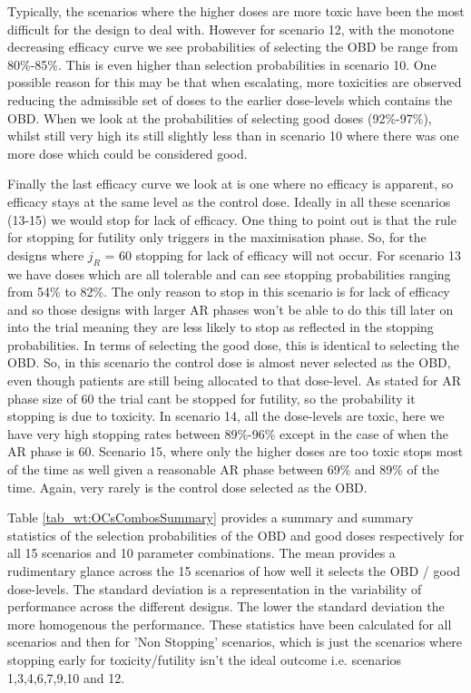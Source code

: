 Typically, the scenarios where the higher doses are more toxic have been the most difficult for the design to deal with. However for scenario 12, with the monotone decreasing efficacy curve we see probabilities of selecting the OBD be range from 80\%-85\%. This is even higher than selection probabilities in scenario 10. One possible reason for this may be that when escalating, more toxicities are observed reducing the admissible set of doses to the earlier dose-levels which contains the OBD. When we look at the probabilities of selecting good doses (92\%-97\%), whilst still very high its still slightly less than in scenario 10 where there was one more dose which could be considered good. 

Finally the last efficacy curve we look at is one where no efficacy is apparent, so efficacy stays at the same level as the control dose. Ideally in all these scenarios (13-15) we would stop for lack of efficacy. One thing to point out is that the rule for stopping for futility only triggers in the maximisation phase. So, for the designs where $j_R$ = 60 stopping for lack of efficacy will not occur. For scenario 13 we have doses which are all tolerable and can see stopping probabilities ranging from 54\% to 82\%. The only reason to stop in this scenario is for lack of efficacy and so those designs with larger AR phases won't be able to do this till later on into the trial meaning they are less likely to stop as reflected in the stopping probabilities. In terms of selecting the good dose, this is identical to selecting the OBD. So, in this scenario the control dose is almost never selected as the OBD, even though patients are still being allocated to that dose-level. As stated for AR phase size of 60 the trial cant be stopped for futility, so the probability it stopping is due to toxicity. In scenario 14, all the dose-levels are toxic, here we have very high stopping rates between 89\%-96\% except in the case of when the AR phase is 60. Scenario 15, where only the higher doses are too toxic stops most of the time as well given a reasonable AR phase between 69\% and 89\% of the time. Again, very rarely is the control dose selected as the OBD. 

Table \ref{tab_wt:OCsCombosSummary} provides a summary and summary statistics of the selection probabilities of the OBD and good doses respectively for all 15 scenarios and 10 parameter combinations. The mean provides a rudimentary glance across the 15 scenarios of how well it selects the OBD / good dose-levels. The standard deviation is a representation in the variability of performance across the different designs. The lower the standard deviation the more homogenous the performance. These statistics have been calculated for all scenarios and then for 'Non Stopping' scenarios, which is just the scenarios where stopping early for toxicity/futility isn't the ideal outcome i.e. scenarios 1,3,4,6,7,9,10 and 12. 


